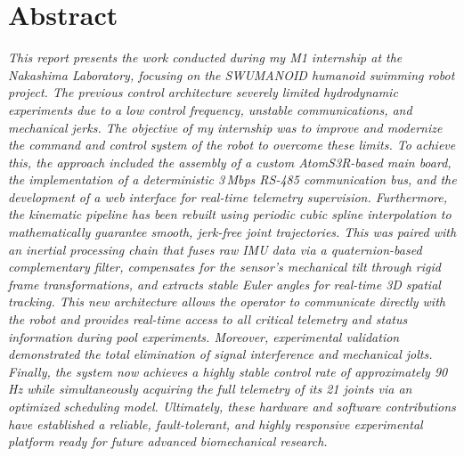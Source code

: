 \documentclass{tropLaClasse}
\begin{document}
\fairemarges
\fairepagedegarde

\clearpage
\pagestyle{empty} %
\section*{Abstract}
\textit{This report presents the work conducted during my M1 internship at the Nakashima Laboratory, focusing on the SWUMANOID humanoid swimming robot project. The previous control architecture severely limited hydrodynamic experiments due to a low control frequency, unstable communications, and mechanical jerks. The objective of my internship was to improve and modernize the command and control system of the robot to overcome these limits. To achieve this, the approach included the assembly of a custom AtomS3R-based main board, the implementation of a deterministic 3\,Mbps RS-485 communication bus, and the development of a web interface for real-time telemetry supervision. Furthermore, the kinematic pipeline has been rebuilt using periodic cubic spline interpolation to mathematically guarantee smooth, jerk-free joint trajectories. This was paired with an inertial processing chain that fuses raw IMU data via a quaternion-based complementary filter, compensates for the sensor's mechanical tilt through rigid frame transformations, and extracts stable Euler angles for real-time 3D spatial tracking. This new architecture allows the operator to communicate directly with the robot and provides real-time access to all critical telemetry and status information during pool experiments. Moreover, experimental validation demonstrated the total elimination of signal interference and mechanical jolts. Finally, the system now achieves a highly stable control rate of approximately 90\,Hz while simultaneously acquiring the full telemetry of its 21 joints via an optimized scheduling model. Ultimately, these hardware and software contributions have established a reliable, fault-tolerant, and highly responsive experimental platform ready for future advanced biomechanical research.
}

\clearpage
\pagestyle{empty} %
{\let\thispagestyle\empty \tabledematieres} %
\end{document}
